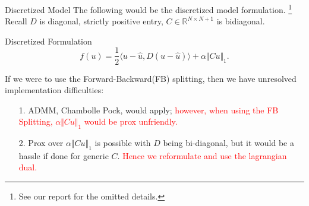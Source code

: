 \documentclass[11pt]{beamer}
\theoremstyle{definition}
\begin{document}
    \begin{frame}{Discretized Model}
        The following would be the discretized model formulation. \footnote{See our report for the omitted details.}
        Recall $D$ is diagonal, strictly positive entry, $C\in \mathbb R^{N\times N+ 1}$ is bidiagonal. 
        \begin{block}{Discretized Formulation}
            \[ 
                f(u) = \frac{1}{2}\langle u - \hat u, D(u - \hat u)\rangle + \alpha \Vert Cu\Vert_1.     
            \]
        \end{block}
        If we were to use the Forward-Backward(FB) splitting, then we have unresolved implementation difficulties: 
        \pause
        \begin{itemize}
            \item [1.] ADMM, Chambolle Pock, would apply; 
                \textcolor{red}{however, when using the FB Splitting, $\alpha\Vert Cu\Vert_1$ would be prox unfriendly. }
            \item [2.] Prox over $\alpha \Vert C u\Vert_1$ is possible with $D$ being bi-diagonal, but it would be a hassle if done for generic $C$. 
            \textcolor{red}{Hence we reformulate and use the lagrangian dual. }
        \end{itemize}
    \end{frame}
\end{document}
